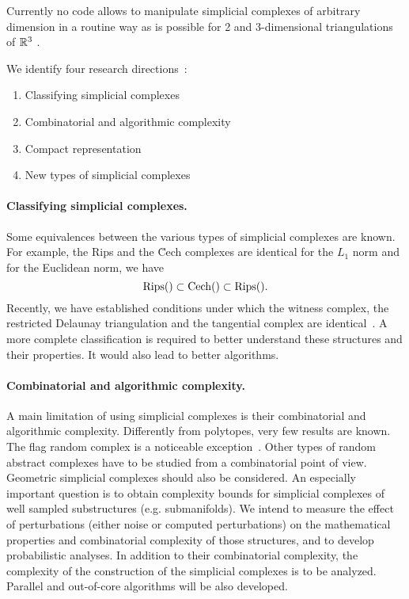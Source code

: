  Currently no code allows to manipulate simplicial complexes of arbitrary dimension in a routine way as is possible for 2 and 3-dimensional triangulations of $\mathbb R ^3$ \cite{springerflo,DBLP:journals/tog/PaoluzziBCF93,svy-crm-99}. 

We identify four research directions~:
\begin{enumerate}
\item Classifying simplicial complexes
\item Combinatorial and algorithmic complexity 
\item Compact representation
\item New types of simplicial complexes
\end{enumerate}

\paragraph{Classifying simplicial complexes.}
Some equivalences between the various types of simplicial complexes are known. For example,
the Rips and the \u{C}ech complexes are identical for the $L_1$ norm and for the Euclidean norm, we have 
\[ {\rm Rips} () \subset {\rm {C}ech} () \subset {\rm Rips} () .\]
Recently, we have established conditions under which the witness complex, the restricted Delaunay triangulation and the tangential complex are identical~\cite{}. A more complete classification is required to better understand these structures and their properties. 
It would also lead to  better algorithms.



\paragraph{Combinatorial and algorithmic complexity.}
A main limitation of using simplicial complexes is their combinatorial and algorithmic complexity.  Differently from polytopes, very few results are known. The flag random complex is a noticeable exception~\cite{}. Other types of random abstract complexes have to be studied from a combinatorial point of view. Geometric simplicial complexes should also be considered.  An especially important question is to obtain complexity bounds for simplicial complexes of well sampled substructures (e.g. submanifolds).  We intend to measure the effect of perturbations (either noise or computed perturbations) on the mathematical properties and combinatorial complexity of those structures, and to develop probabilistic analyses. In addition to their combinatorial complexity, the complexity of the construction of the simplicial complexes is to be analyzed.  Parallel and out-of-core algorithms will be also developed.


